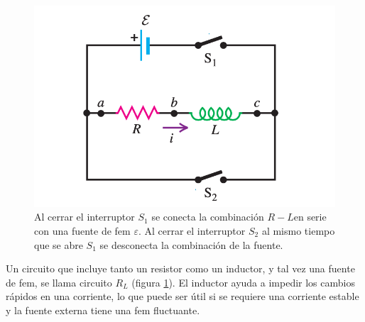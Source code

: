 \begin{figure}[b]\label{fig:circuito2}
\centering
\includegraphics[scale=0.4]{fig/circuito2}
\caption{Al cerrar el interruptor $S_1$ se conecta la combinación $R-L $en serie con una fuente de fem $\varepsilon$. Al cerrar el interruptor $S_2$ al mismo tiempo que se abre $S_1$ se desconecta la combinación de la fuente.}
\end{figure}

Un circuito que incluye tanto un resistor como un inductor, y tal vez una fuente de fem, se llama circuito $R_L$ (figura \ref{fig:circuito2}).  El inductor ayuda a impedir los cambios rápidos en una corriente, lo que puede ser útil si se requiere una corriente estable y la fuente externa tiene una fem fluctuante.







%

